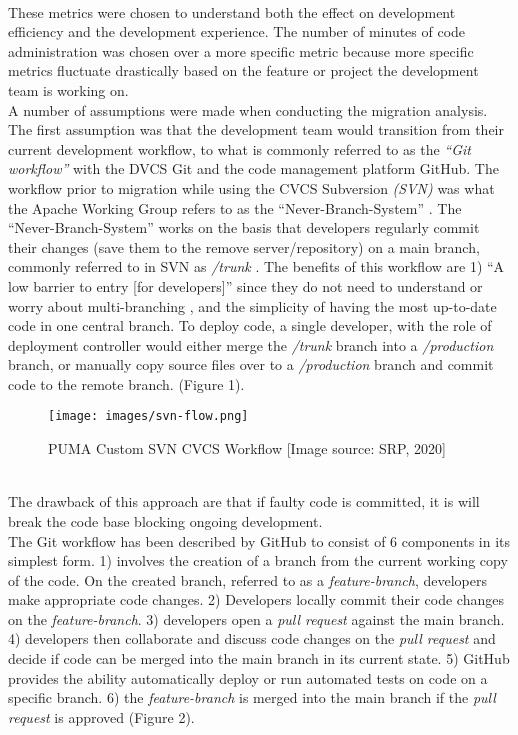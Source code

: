 \documentclass{article}
\begin{document}
{\\
\indent
These metrics were chosen to understand both the effect on development efficiency and the development experience. The number of minutes of code administration was chosen over a more specific metric because more specific metrics fluctuate drastically based on the feature or project the development team is working on.
\\
\indent
A number of assumptions were made when conducting the migration analysis. The first assumption was that the development team would transition from their current development workflow, to what is commonly referred to as the \textit{“Git workflow”} with the DVCS Git and the code management platform GitHub. The workflow prior to migration while using the CVCS Subversion \textit{(SVN)} was what the Apache Working Group refers to as the “Never-Branch-System” \cite{software-best-practices}. The “Never-Branch-System” works on the basis that developers regularly commit their changes (save them to the remove server/repository) on a main branch, commonly referred to in SVN as \textit{/trunk} \cite{software-best-practices}. The benefits of this workflow are 1) “A low barrier to entry [for developers]” since they do not need to understand or worry about multi-branching \cite{software-best-practices}, and the simplicity of having the most up-to-date code in one central branch. To deploy code, a single developer, with the role of deployment controller would either merge the \textit{/trunk} branch into a \textit{/production} branch, or manually copy source files over to a \textit{/production} branch and commit code to the remote branch. (Figure 1). 
\begin{figure}[h]
\centering
\texttt{[image: images/svn-flow.png]}
\caption{PUMA Custom SVN CVCS Workflow [Image source: SRP, 2020]}
\end{figure}
\\
\indent
The drawback of this approach are that if faulty code is committed, it is will break the code base blocking ongoing development.
\\
\indent
The Git workflow has been described by GitHub to consist of 6 components in its simplest form. \cite{understanding-git-workflow} 1) involves the creation of a branch from the current working copy of the code. On the created branch, referred to as a \textit{feature-branch}, developers make appropriate code changes. 2) Developers locally commit their code changes on the \textit{feature-branch}. 3) developers open a \textit{pull request} against the main branch. 4) developers then collaborate and discuss code changes on the \textit{pull request} and decide if code can be merged into the main branch in its current state. 5) GitHub provides the ability automatically deploy or run automated tests on code on a specific branch. 6) the \textit{feature-branch} is merged into the main branch if the \textit{pull request} is approved (Figure 2). 
}
\end{document}
